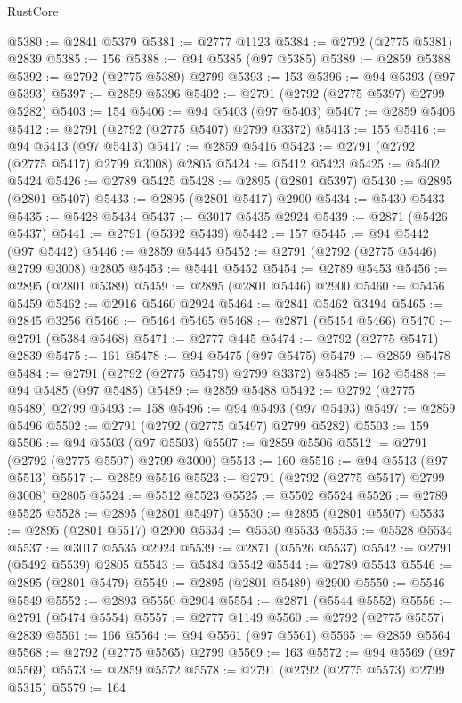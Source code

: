 \begin{lexlean}{RustCore}
\begin{coremodule}
@5380 := @2841 @5379
@5381 := @2777 @1123
@5384 := @2792 (@2775 @5381) @2839
@5385 := 156
@5388 := @94 @5385 (@97 @5385)
@5389 := @2859 @5388
@5392 := @2792 (@2775 @5389) @2799
@5393 := 153
@5396 := @94 @5393 (@97 @5393)
@5397 := @2859 @5396
@5402 := @2791 (@2792 (@2775 @5397) @2799 @5282)
@5403 := 154
@5406 := @94 @5403 (@97 @5403)
@5407 := @2859 @5406
@5412 := @2791 (@2792 (@2775 @5407) @2799 @3372)
@5413 := 155
@5416 := @94 @5413 (@97 @5413)
@5417 := @2859 @5416
@5423 := @2791 (@2792 (@2775 @5417) @2799 @3008) @2805
@5424 := @5412 @5423
@5425 := @5402 @5424
@5426 := @2789 @5425
@5428 := @2895 (@2801 @5397)
@5430 := @2895 (@2801 @5407)
@5433 := @2895 (@2801 @5417) @2900
@5434 := @5430 @5433
@5435 := @5428 @5434
@5437 := @3017 @5435 @2924
@5439 := @2871 (@5426 @5437)
@5441 := @2791 (@5392 @5439)
@5442 := 157
@5445 := @94 @5442 (@97 @5442)
@5446 := @2859 @5445
@5452 := @2791 (@2792 (@2775 @5446) @2799 @3008) @2805
@5453 := @5441 @5452
@5454 := @2789 @5453
@5456 := @2895 (@2801 @5389)
@5459 := @2895 (@2801 @5446) @2900
@5460 := @5456 @5459
@5462 := @2916 @5460 @2924
@5464 := @2841 @5462 @3494
@5465 := @2845 @3256
@5466 := @5464 @5465
@5468 := @2871 (@5454 @5466)
@5470 := @2791 (@5384 @5468)
@5471 := @2777 @445
@5474 := @2792 (@2775 @5471) @2839
@5475 := 161
@5478 := @94 @5475 (@97 @5475)
@5479 := @2859 @5478
@5484 := @2791 (@2792 (@2775 @5479) @2799 @3372)
@5485 := 162
@5488 := @94 @5485 (@97 @5485)
@5489 := @2859 @5488
@5492 := @2792 (@2775 @5489) @2799
@5493 := 158
@5496 := @94 @5493 (@97 @5493)
@5497 := @2859 @5496
@5502 := @2791 (@2792 (@2775 @5497) @2799 @5282)
@5503 := 159
@5506 := @94 @5503 (@97 @5503)
@5507 := @2859 @5506
@5512 := @2791 (@2792 (@2775 @5507) @2799 @3000)
@5513 := 160
@5516 := @94 @5513 (@97 @5513)
@5517 := @2859 @5516
@5523 := @2791 (@2792 (@2775 @5517) @2799 @3008) @2805
@5524 := @5512 @5523
@5525 := @5502 @5524
@5526 := @2789 @5525
@5528 := @2895 (@2801 @5497)
@5530 := @2895 (@2801 @5507)
@5533 := @2895 (@2801 @5517) @2900
@5534 := @5530 @5533
@5535 := @5528 @5534
@5537 := @3017 @5535 @2924
@5539 := @2871 (@5526 @5537)
@5542 := @2791 (@5492 @5539) @2805
@5543 := @5484 @5542
@5544 := @2789 @5543
@5546 := @2895 (@2801 @5479)
@5549 := @2895 (@2801 @5489) @2900
@5550 := @5546 @5549
@5552 := @2893 @5550 @2904
@5554 := @2871 (@5544 @5552)
@5556 := @2791 (@5474 @5554)
@5557 := @2777 @1149
@5560 := @2792 (@2775 @5557) @2839
@5561 := 166
@5564 := @94 @5561 (@97 @5561)
@5565 := @2859 @5564
@5568 := @2792 (@2775 @5565) @2799
@5569 := 163
@5572 := @94 @5569 (@97 @5569)
@5573 := @2859 @5572
@5578 := @2791 (@2792 (@2775 @5573) @2799 @5315)
@5579 := 164

\end{coremodule}
\end{lexlean}
